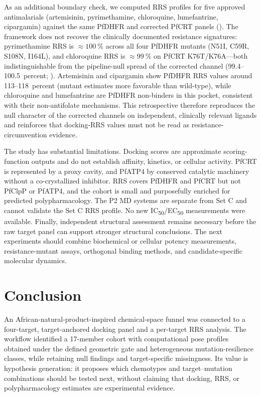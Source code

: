 \documentclass[journal=jcisd8,manuscript=article]{achemso}
\begin{document}
As an additional boundary check, we computed RRS profiles for five approved antimalarials (artemisinin, pyrimethamine, chloroquine, lumefantrine, cipargamin) against the same PfDHFR and corrected PfCRT panels (). The framework does not recover the clinically documented resistance signatures: pyrimethamine RRS is $\approx\qty{100}{\percent}$ across all four PfDHFR mutants (N51I, C59R, S108N, I164L), and chloroquine RRS is $\approx\qty{99}{\percent}$ on PfCRT K76T/K76A---both indistinguishable from the pipeline-null spread of the corrected channel (\numrange{99.4}{100.5}~percent; ). Artemisinin and cipargamin show PfDHFR RRS values around \numrange{113}{118}~percent (mutant estimates more favorable than wild-type), while chloroquine and lumefantrine are PfDHFR non-binders in this pocket, consistent with their non-antifolate mechanisms. This retrospective therefore reproduces the null character of the corrected channels on independent, clinically relevant ligands and reinforces that docking-RRS values must not be read as resistance-circumvention evidence.

The study has substantial limitations. Docking scores are approximate scoring-function outputs and do not establish affinity, kinetics, or cellular activity. PfCRT is represented by a proxy cavity, and PfATP4 by conserved catalytic machinery without a co-crystallized inhibitor. RRS covers PfDHFR and PfCRT but not PfClpP or PfATP4, and the cohort is small and purposefully enriched for predicted polypharmacology. The P2 MD systems are separate from Set C and cannot validate the Set C RRS profile. No new IC\textsubscript{50}/EC\textsubscript{50} measurements were available. Finally, independent structural assessment remains necessary before the raw target panel can support stronger structural conclusions. The next experiments should combine biochemical or cellular potency measurements, resistance-mutant assays, orthogonal binding methods, and candidate-specific molecular dynamics.

\section{Conclusion}\label{sec:conclusion}
An African-natural-product-inspired chemical-space funnel was connected to a four-target, target-anchored docking panel and a per-target RRS analysis. The workflow identified a 17-member cohort with computational pose profiles obtained under the defined geometric gate and heterogeneous mutation-resilience classes, while retaining null findings and target-specific missingness. Its value is hypothesis generation: it proposes which chemotypes and target--mutation combinations should be tested next, without claiming that docking, RRS, or polypharmacology estimates are experimental evidence.
\end{document}
